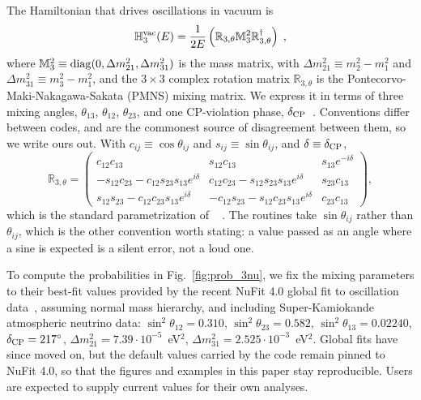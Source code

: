 \documentclass[final,5p,times,twocolumn]{elsarticle}
\newcommand{\fig}{Fig.}
\providecommand{\Ref}{} %
\newcommand{\figu}[1]{\fig~\ref{fig:#1}}
\providecommand{\DIFaddtex}[1]{{\protect\color{blue} \sf #1}} %
\providecommand{\DIFaddbegin}{} %
\providecommand{\DIFaddend}{} %
\providecommand{\DIFadd}[1]{\DIFaddtex{#1}} %
\begin{document}
The Hamiltonian that drives oscillations in vacuum is
\begin{equation}
 \label{equ:h3_vacuum}
 \mathbb{H}_3^{\rm vac}(E)
 = 
 \frac{1}{2E} \left( \mathbb{R}_{3,\theta} \mathbb{M}_3^2 \mathbb{R}_{3,\theta}^\dagger \right) \;,
\end{equation}
where $\mathbb{M}_3^2 \equiv {\rm diag}(0, \Delta m_{21}^2, \Delta m_{31}^2)$ is the mass matrix, with $\Delta m_{21}^2 \equiv m_2^2-m_1^2$ and $\Delta m_{31}^2 \equiv m_3^2-m_1^2$, and the $3 \times 3$ complex rotation matrix $\mathbb{R}_{3,\theta}$ is the Pontecorvo-Maki-Nakagawa-Sakata (PMNS) mixing matrix.  We express it in terms of three mixing angles, $\theta_{13}$, $\theta_{12}$, $\theta_{23}$, and one CP-violation phase, $\delta_{\rm CP}$\ \cite{Tanabashi:2018oca}.  \DIFaddbegin \DIFadd{Conventions differ between codes, and are the commonest source of disagreement between them, so we write ours out.  With $c_{ij} \equiv \cos\theta_{ij}$ and $s_{ij} \equiv \sin\theta_{ij}$, and $\delta \equiv \delta_{\rm CP}$,
}\begin{equation}
 \label{equ:pmns}
 \mathbb{R}_{3,\theta}
 =
 \left(
 \begin{array}{ccc}
  c_{12}c_{13} & s_{12}c_{13} & s_{13}e^{-i\delta} \\
  -s_{12}c_{23}-c_{12}s_{23}s_{13}e^{i\delta} & c_{12}c_{23}-s_{12}s_{23}s_{13}e^{i\delta} & s_{23}c_{13} \\
  s_{12}s_{23}-c_{12}c_{23}s_{13}e^{i\delta} & -c_{12}s_{23}-s_{12}c_{23}s_{13}e^{i\delta} & c_{23}c_{13}
 \end{array}
 \right) ,
\end{equation}
\DIFadd{which is the standard parametrization of \Ref\ }\cite{Tanabashi:2018oca}\DIFadd{.  The routines take $\sin\theta_{ij}$ rather than $\theta_{ij}$, which is the other convention worth stating: a value passed as an angle where a sine is expected is a silent error, not a loud one.  
}\DIFaddend 

To compute the probabilities in \figu{prob_3nu}, we fix the mixing parameters to their best-fit values provided by the recent NuFit 4.0 global fit to oscillation data\ \cite{Esteban:2018azc, NuFit4.0}, assuming normal mass hierarchy, and including Super-Kamiokande atmospheric neutrino data: $\sin^2 \theta_{12} = 0.310$, $\sin^2 \theta_{23} = 0.582$, $\sin^2 \theta_{13} = 0.02240$, $\delta_{\rm CP} = 217^\circ$, $\Delta m_{21}^2 = 7.39 \cdot 10^{-5}$~eV$^2$, $\Delta m_{31}^2 = 2.525 \cdot 10^{-3}$~eV$^2$.  \DIFaddbegin \DIFadd{Global fits have since moved on, but the default values carried by the code remain pinned to NuFit 4.0, so that the figures and examples in this paper stay reproducible.  Users are expected to supply current values for their own analyses.
}\DIFaddend 
\end{document}
